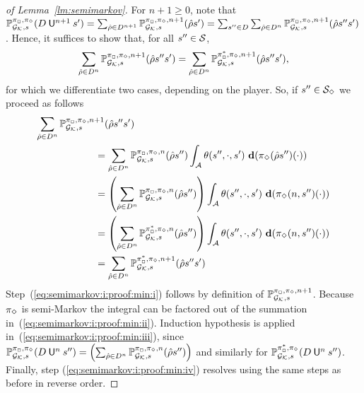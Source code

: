 \begin{proof}[of Lemma~\ref{lm:semimarkov}]
  For $n + 1 \geq 0$, note that
%
  $
  \mathbb{P}^{\pi_{{\Box}},\pi_{{\Diamond}}}_{{\mathcal{G}_{\mathcal{K}}},s}(D \mathbin{\mathsf{U}}^{n+1} s')
  = \sum_{\hat{\rho} \in D^{n+1}} \mathbb{P}^{\pi_{{\Box}},\pi_{{\Diamond}},n+1}_{{\mathcal{G}_{\mathcal{K}}},s}(\hat{\rho}s')
  = \sum_{s'' \in D}\sum_{\hat{\rho} \in D^n} \mathbb{P}^{\pi_{{\Box}},\pi_{{\Diamond}},n+1}_{{\mathcal{G}_{\mathcal{K}}},s}(\hat{\rho}s''s')
  $.
%
  Hence, it suffices to show that, for all $s''\in\mathcal{S}$,
%
  \[\sum_{\hat{\rho} \in D^n} \mathbb{P}^{\pi_{{\Box}},\pi_{{\Diamond}},n+1}_{{\mathcal{G}_{\mathcal{K}}},s}(\hat{\rho}s''s')
  =
  \sum_{\hat{\rho} \in D^n} \mathbb{P}^{\pi^*_{{\Box}},\pi_{{\Diamond}},n+1}_{{\mathcal{G}_{\mathcal{K}}},s}(\hat{\rho}s''s'),
  \]
%
  for which we differentiate two cases, depending on the player. So,
  if $s''\in\mathcal{S}_{\Diamond}$ we proceed as follows
  \begin{align}
    \sum_{\hat{\rho} \in D^n} \Prob^{\strat_{\maxplay},\strat_{\minplay},n+1}_{\StochGK,s}(\hat{\rho}s''s') \hspace{-4em} &\notag\\
    & =
    \sum_{\hat{\rho} \in D^n} \Prob^{\strat_{\maxplay},\strat_{\minplay},n}_{\StochGK,s}(\hat{\rho}s'')\int_{\sgactions}\sgtrans(s'',\cdot,s')\ \diff(\strat_{\minplay}(\hat{\rho}s'')(\cdot))
    \label{eq:semimarkov:i:proof:min:i}\\
    & =
    \left(\sum_{\hat{\rho} \in D^n} \Prob^{\strat_{\maxplay},\strat_{\minplay},n}_{\StochGK,s}(\hat{\rho}s'')\right)\int_{\sgactions}\sgtrans(s'',\cdot,s')\ \diff(\strat_{\minplay}(n,s'')(\cdot))
    \label{eq:semimarkov:i:proof:min:ii}\\
    & =
    \left(\sum_{\hat{\rho} \in D^n} \Prob^{\starredstrat_{\maxplay},\strat_{\minplay},n}_{\StochGK,s}(\hat{\rho}s'')\right)\int_{\sgactions}\sgtrans(s'',\cdot,s')\ \diff(\strat_{\minplay}(n,s'')(\cdot))
    \label{eq:semimarkov:i:proof:min:iii}\\
    & =
    \sum_{\hat{\rho} \in D^n} \Prob^{\starredstrat_{\maxplay},\strat_{\minplay},n+1}_{\StochGK,s}(\hat{\rho}s''s')
    \label{eq:semimarkov:i:proof:min:iv}
  \end{align}
  Step~(\ref{eq:semimarkov:i:proof:min:i}) follows by definition of
  $\mathbb{P}^{\pi_{{\Box}},\pi_{{\Diamond}},n+1}_{{\mathcal{G}_{\mathcal{K}}},s}$.
  Because $\pi_{\Diamond}$ is semi-Markov the integral can be
  factored out of the summation in~(\ref{eq:semimarkov:i:proof:min:ii}).
  Induction hypothesis is applied
  in~(\ref{eq:semimarkov:i:proof:min:iii}), since
  $\mathbb{P}^{\pi_{{\Box}},\pi_{{\Diamond}}}_{{\mathcal{G}_{\mathcal{K}}},s}(D \mathbin{\mathsf{U}}^n s'')
  =
  \left(\sum_{\hat{\rho} \in D^n} \mathbb{P}^{\pi_{{\Box}},\pi_{{\Diamond}},n}_{{\mathcal{G}_{\mathcal{K}}},s}(\hat{\rho}s'')\right)$
  and similarly for
  $\mathbb{P}^{\pi^*_{{\Box}},\pi_{{\Diamond}}}_{{\mathcal{G}_{\mathcal{K}}},s}(D \mathbin{\mathsf{U}}^n s'')$.
  Finally, step (\ref{eq:semimarkov:i:proof:min:iv}) resolves using
  the same steps as before in reverse order.


\end{proof}
